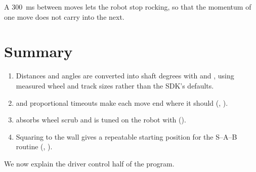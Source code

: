 A 300~ms  between moves lets the robot stop rocking, so that the
momentum of one move does not carry into the next.

\section{Summary}

\begin{enumerate}
  \item Distances and angles are converted into shaft degrees with
     and , using measured wheel and track sizes
    rather than the SDK's defaults.
  \item {} and proportional timeouts make each move end where it
    should (, ).
  \item {} absorbs wheel scrub and is tuned on the robot with
     ().
  \item Squaring to the wall gives a repeatable starting position for the
    S--A--B routine (, ).
\end{enumerate}

We now explain the driver control half of the program.
